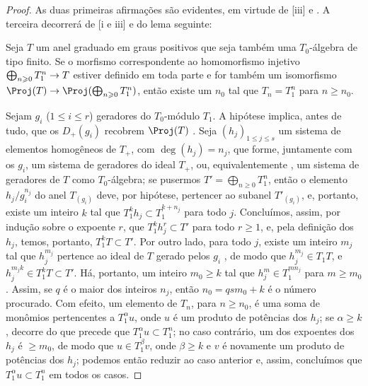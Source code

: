\documentclass[oneside,10pt]{amsart}
\makeatletter
\renewcommand{\leq}{\leqslant}
\renewcommand{\geq}{\geqslant}
\newcommand{\ega@arrow}[2]{\mathchoice{#1}{#2}{#2}{#2}}
\renewcommand{\to}{\ega@arrow{\longrightarrow}{\rightarrow}}
\newcommand{\oldpage}[2][]{\marginnote{\normalfont\footnotesize\textbf{#1}~|~#2}\ignorespaces}
\let\EGAOriginalLabel\label
\renewcommand{\label}[1]{\phantomsection\EGAOriginalLabel{#1}}
\makeatother
\begin{document}
\begin{proof}
As duas primeiras afirmações são evidentes, em virtude de [iii] e .
A terceira decorrerá de [i e iii] e do lema seguinte:
\begin{lemma}[8.2.14.1]
\label{II.8.2.14.1}
Seja $T$ um anel graduado em graus positivos que seja também uma $T_0$-álgebra de tipo finito.
Se o morfismo correspondente ao homomorfismo injetivo $\bigoplus_{n\geq0}T_1^n\to T$ estiver definido em toda parte e for também um isomorfismo $\Proj(T)\to\Proj(\bigoplus_{n\geq0}T_1^n)$, então existe um $n_0$ tal que $T_n=T_1^n$ para $n\geq n_0$.
\end{lemma}

Sejam $g_i$ ($1\leq i\leq r$) geradores do $T_0$-módulo $T_1$.
A hipótese implica, antes de tudo, que os $D_+(g_i)$ recobrem $\Proj(T)$ .
Seja $(h_j)_{1\leq j\leq s}$ um sistema de elementos homogêneos de $T_+$, com $\deg(h_j)=n_j$, que forme, juntamente com os $g_i$, um sistema de geradores do ideal $T_+$, ou, equivalentemente , um sistema de geradores de $T$ como $T_0$-álgebra;
se pusermos $T'=\bigoplus_{n\geq0}T_1^n$, então o elemento $h_j/g_i^{n_j}$ do anel $T_{(g_i)}$ deve, por hipótese, pertencer ao subanel $T'_{(g_i)}$, e, portanto, existe um inteiro $k$ tal que $T_1^k h_j\subset T_1^{k+n_j}$ para todo $j$.
Concluímos, assim, por indução sobre o expoente $r$, que $T_1^k h_j^r \subset T'$ para todo $r\geq1$, e, pela definição dos $h_j$, temos, portanto, $T_1^k T\subset T'$.
Por outro lado, para todo $j$, existe um inteiro $m_j$ tal que $h_j^{m_j}$ pertence ao ideal de $T$ gerado pelos $g_i$ , de modo que $h_j^{m_j}\in T_1 T$, e
\oldpage[II]{162}
$h_j^{m_j k}\in T_1^k T\subset T'$.
Há, portanto, um inteiro $m_0\geq k$ tal que $h_j^m\in T_1^{m n_j}$ para $m\geq m_0$.
Assim, se $q$ é o maior dos inteiros $n_j$, então $n_0=q s m_0+k$ é o número procurado.
Com efeito, um elemento de $T_n$, para $n\geq n_0$, é uma soma de monômios pertencentes a $T_1^\alpha u$, onde $u$ é um produto de potências dos $h_j$;
se $\alpha\geq k$, decorre do que precede que $T_1^\alpha u\subset T_1^n$;
no caso contrário, um dos expoentes dos $h_j$ é $\geq m_0$, de modo que $u\in T_1^\beta v$, onde $\beta\geq k$ e $v$ é novamente um produto de potências dos $h_j$;
podemos então reduzir ao caso anterior e, assim, concluímos que $T_1^\alpha u\subset T_1^n$ em todos os casos.
\end{proof}
\end{document}

